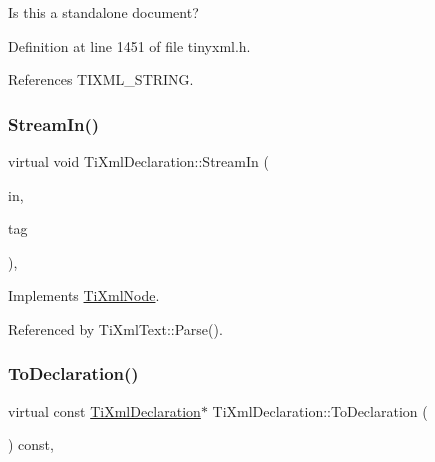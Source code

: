 Is this a standalone document? 



Definition at line 1451 of file tinyxml.\+h.



References T\+I\+X\+M\+L\+\_\+\+S\+T\+R\+I\+NG.

\hypertarget{class_ti_xml_declaration_a72e455200e6b6e265e76bdec4417bb73}{}\label{class_ti_xml_declaration_a72e455200e6b6e265e76bdec4417bb73} 
\subsubsection{\texorpdfstring{Stream\+In()}{StreamIn()}}
{\footnotesize\ttfamily virtual void Ti\+Xml\+Declaration\+::\+Stream\+In (\begin{DoxyParamCaption}\item[{std\+::istream $\ast$}]{in,  }\item[{\hyperlink{tinyxml_8h_a92bada05fd84d9a0c9a5bbe53de26887}{T\+I\+X\+M\+L\+\_\+\+S\+T\+R\+I\+NG} $\ast$}]{tag }\end{DoxyParamCaption})\hspace{0.3cm}{\ttfamily [protected]}, {\ttfamily [virtual]}}



Implements \hyperlink{class_ti_xml_node_ab4b4af1a6b486dcbc0e327cf291270af}{Ti\+Xml\+Node}.



Referenced by Ti\+Xml\+Text\+::\+Parse().

\hypertarget{class_ti_xml_declaration_aab62703b620d9b9391b482dc1835ecf6}{}\label{class_ti_xml_declaration_aab62703b620d9b9391b482dc1835ecf6} 
\subsubsection{\texorpdfstring{To\+Declaration()}{ToDeclaration()}\hspace{0.1cm}{\footnotesize\ttfamily [1/2]}}
{\footnotesize\ttfamily virtual const \hyperlink{class_ti_xml_declaration}{Ti\+Xml\+Declaration}$\ast$ Ti\+Xml\+Declaration\+::\+To\+Declaration (\begin{DoxyParamCaption}{ }\end{DoxyParamCaption}) const\hspace{0.3cm}{\ttfamily [inline]}, {\ttfamily [virtual]}}



